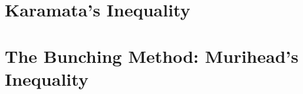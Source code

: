 \documentclass[inequalities.tex]{subfile}
\begin{document}
	\section{Karamata's Inequality}\label{sec:karamata}
	
	\section{The Bunching Method: Murihead's Inequality}\label{sec:bunching}
\end{document}
